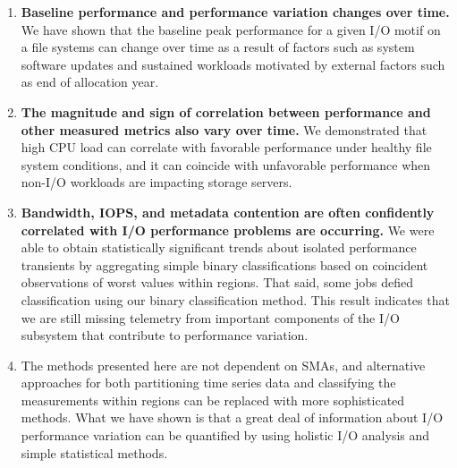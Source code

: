 \begin{enumerate}


\item \textbf{Baseline performance and performance variation changes over time.}
We have shown that the baseline peak performance for a given I/O motif on a file systems can change over time as a result of factors such as system software updates and sustained workloads motivated by external factors such as end of allocation year.

\item \textbf{The magnitude and sign of correlation between performance and other measured metrics also vary over time.} 
We demonstrated that high CPU load can correlate with favorable performance under healthy file system conditions, and it can coincide with unfavorable performance when non-I/O workloads are impacting storage servers.

\item \textbf{Bandwidth, IOPS, and metadata contention are often confidently correlated with I/O performance problems are occurring.}
We were able to obtain statistically significant trends about isolated performance transients by aggregating simple binary classifications based on coincident observations of worst values within regions.
That said, some jobs defied classification using our binary classification method.
This result indicates that we are still missing telemetry from important components of the I/O subsystem that contribute to performance variation.

\item The methods presented here are not dependent on SMAs, and alternative approaches for both partitioning time series data and classifying the measurements within regions can be replaced with more sophisticated methods.
What we have shown is that a great deal of information about I/O performance variation can be quantified by using holistic I/O analysis and simple statistical methods.
\end{enumerate}
